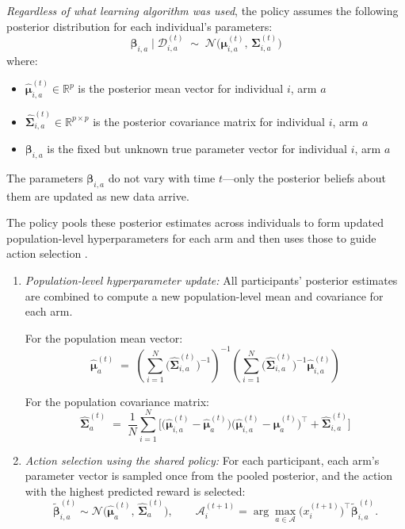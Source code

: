 \documentclass[letterpaper, 11pt]{extarticle}
\begin{document}
\textit{Regardless of what learning algorithm was used}, the policy assumes the following posterior distribution for each individual's parameters:
\[
\boldsymbol{\beta}_{i,a} \mid \mathcal{D}_{i,a}^{(t)} 
\;\sim\; \mathcal{N}\!\big(\boldsymbol{\mu}_{i,a}^{(t)},\, \boldsymbol{\Sigma}_{i,a}^{(t)}\big)
\]
where:
\begin{itemize}
\item $\hat{\boldsymbol{\mu}}_{i,a}^{(t)} \in \mathbb{R}^p$ is the posterior mean vector for individual $i$, arm $a$
\item $\hat{\boldsymbol{\Sigma}}_{i,a}^{(t)} \in \mathbb{R}^{p \times p}$ is the posterior covariance matrix for individual $i$, arm $a$
\item $\boldsymbol{\beta}_{i,a}$ is the fixed but unknown true parameter vector for individual $i$, arm $a$
\end{itemize}

The parameters $\boldsymbol{\beta}_{i,a}$ do not vary with time $t$—only the posterior beliefs about them are updated as new data arrive.

\vspace{0.5em}

The policy pools these posterior estimates across individuals to form updated population-level hyperparameters for each arm and then uses those to guide action selection \cite{doi:10.3102/10769986010002075}.

\begin{enumerate}

\item \textit{Population-level hyperparameter update:}
All participants' posterior estimates are combined to compute a new population-level mean and covariance for each arm.

For the population mean vector:
\[
\hat{\boldsymbol{\mu}}_a^{(t)} \;=\; 
\left(\sum_{i=1}^N \big(\hat{\boldsymbol{\Sigma}}_{i,a}^{(t)}\big)^{-1}\right)^{-1}
\!\left(\sum_{i=1}^N \big(\hat{\boldsymbol{\Sigma}}_{i,a}^{(t)}\big)^{-1}\hat{\boldsymbol{\mu}}_{i,a}^{(t)}\right)
\]

For the population covariance matrix:
\[
\hat{\boldsymbol{\Sigma}}_a^{(t)} \;=\; 
\frac{1}{N} \sum_{i=1}^N 
\!\Big[
  \big(\hat{\boldsymbol{\mu}}_{i,a}^{(t)} - \hat{\boldsymbol{\mu}}_a^{(t)}\big)
  \big(\hat{\boldsymbol{\mu}}_{i,a}^{(t)} - \hat{\boldsymbol{\mu}}_a^{(t)}\big)^\top 
  + \hat{\boldsymbol{\Sigma}}_{i,a}^{(t)}
\Big]
\]

\item \textit{Action selection using the shared policy:}
For each participant, each arm’s parameter vector is sampled once from the pooled posterior,
and the action with the highest predicted reward is selected:
\[
\tilde{\boldsymbol{\beta}}_{i,a}^{(t)} \sim 
\mathcal{N}\!\big(\hat{\boldsymbol{\mu}}_a^{(t)},\, \hat{\boldsymbol{\Sigma}}_a^{(t)}\big),
\qquad
\mathcal{A}_i^{(t+1)} 
= \arg\max_{a \in \mathcal{A}} \big(x_{i}^{(t+1)}\big)^{\top}\tilde{\boldsymbol{\beta}}_{i,a}^{(t)}.
\]

\end{enumerate}
\newpage


\end{document}
